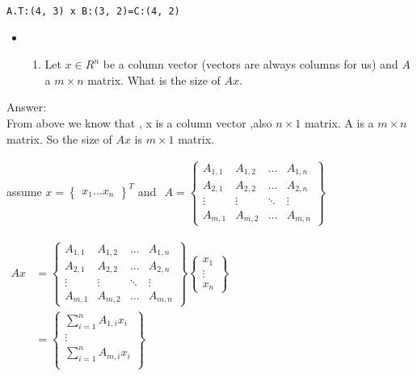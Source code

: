 \documentclass[11pt]{article}
\providecommand{\tightlist}{%
      \setlength{\itemsep}{0pt}\setlength{\parskip}{0pt}}
\begin{document}
    \begin{Verbatim}[commandchars=\\\{\}]
A.T:(4, 3) x B:(3, 2)=C:(4, 2)

    \end{Verbatim}

    \begin{itemize}
\item
  \begin{enumerate}
  \def\labelenumi{(\alph{enumi})}
  \setcounter{enumi}{1}
  \tightlist
  \item
    Let \(x \in R^n\) be a column vector (vectors are always columns for
    us) and \(A\) a \(m × n\) matrix. What is the size of \(Ax\).
  \end{enumerate}
\end{itemize}

    Answer:\\
From above we know that , x is a column vector ,also \(n×1\) matrix. A
is a \(m × n\) matrix. So the size of \(Ax\) is \(m×1\) matrix.

assume \(x=\left\{\begin{matrix}x_1 \dots x_n\end{matrix}\right\}^T\)
and
\(\begin{aligned}  A=\left\{\begin{matrix}  A_{1,1} & A_{1,2} & \dots & A_{1,n} \\  A_{2,1} & A_{2,2} & \dots & A_{2,n} \\  \vdots & \vdots & \ddots & \vdots \\  A_{m,1} & A_{m,2} & \dots & A_{m,n}  \end{matrix}\right\} \end{aligned}\)

\(\begin{aligned}  Ax &= \left\{\begin{matrix}  A_{1,1} & A_{1,2} & \dots & A_{1,n} \\  A_{2,1} & A_{2,2} & \dots & A_{2,n} \\  \vdots & \vdots & \ddots & \vdots \\  A_{m,1} & A_{m,2} & \dots & A_{m,n}  \end{matrix}\right\}  \left\{\begin{matrix}x_1 \\  \vdots \\  x_n\end{matrix}\right\} \\  &= \left\{\begin{matrix}  \sum_{i=1}^{n} A_{1,i}x_i \\  \vdots \\  \sum_{i=1}^{n} A_{m,i}x_i \\  \end{matrix}\right\} \end{aligned}\)
\end{document}

